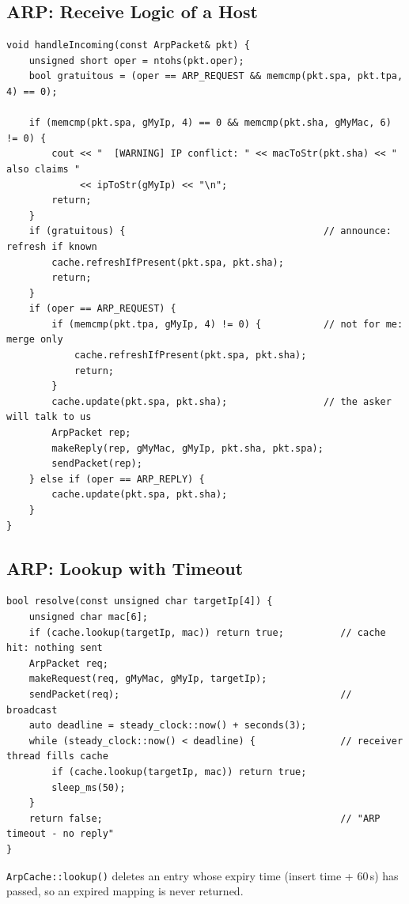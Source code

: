 \documentclass[11pt]{article}
\begin{document}
\subsection{ARP: Receive Logic of a Host}
\begin{lstlisting}
void handleIncoming(const ArpPacket& pkt) {
    unsigned short oper = ntohs(pkt.oper);
    bool gratuitous = (oper == ARP_REQUEST && memcmp(pkt.spa, pkt.tpa, 4) == 0);

    if (memcmp(pkt.spa, gMyIp, 4) == 0 && memcmp(pkt.sha, gMyMac, 6) != 0) {
        cout << "  [WARNING] IP conflict: " << macToStr(pkt.sha) << " also claims "
             << ipToStr(gMyIp) << "\n";
        return;
    }
    if (gratuitous) {                                   // announce: refresh if known
        cache.refreshIfPresent(pkt.spa, pkt.sha);
        return;
    }
    if (oper == ARP_REQUEST) {
        if (memcmp(pkt.tpa, gMyIp, 4) != 0) {           // not for me: merge only
            cache.refreshIfPresent(pkt.spa, pkt.sha);
            return;
        }
        cache.update(pkt.spa, pkt.sha);                 // the asker will talk to us
        ArpPacket rep;
        makeReply(rep, gMyMac, gMyIp, pkt.sha, pkt.spa);
        sendPacket(rep);
    } else if (oper == ARP_REPLY) {
        cache.update(pkt.spa, pkt.sha);
    }
}
\end{lstlisting}

\subsection{ARP: Lookup with Timeout}
\begin{lstlisting}
bool resolve(const unsigned char targetIp[4]) {
    unsigned char mac[6];
    if (cache.lookup(targetIp, mac)) return true;          // cache hit: nothing sent
    ArpPacket req;
    makeRequest(req, gMyMac, gMyIp, targetIp);
    sendPacket(req);                                       // broadcast
    auto deadline = steady_clock::now() + seconds(3);
    while (steady_clock::now() < deadline) {               // receiver thread fills cache
        if (cache.lookup(targetIp, mac)) return true;
        sleep_ms(50);
    }
    return false;                                          // "ARP timeout - no reply"
}
\end{lstlisting}
\texttt{ArpCache::lookup()} deletes an entry whose expiry time (insert time + 60\,s) has
passed, so an expired mapping is never returned.
\end{document}
